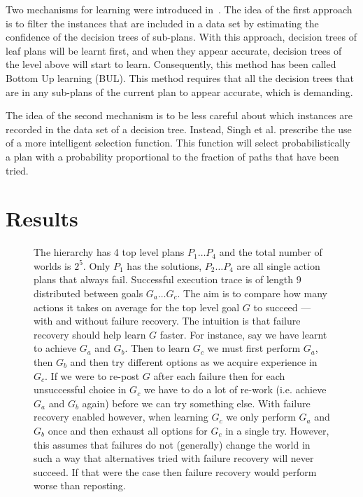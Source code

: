 \documentclass{article}
\begin{document}
Two mechanisms for learning were introduced
in~\cite{Singh10:Learning}. The idea of the first approach is to
filter the instances that are included in a data set by estimating the
confidence of the decision trees of sub-plans. With this approach,
decision trees of leaf plans will be learnt first, and when they
appear accurate, decision trees of the level above will start to
learn. Consequently, this method has been called Bottom Up learning
(BUL). This method requires that all the decision trees that are in
any sub-plans of the current plan to appear accurate, which is
demanding.

The idea of the second mechanism is to be less careful about which
instances are recorded in the data set of a decision tree. Instead,
Singh et al. prescribe the use of a more intelligent selection
function. This function will select probabilistically a plan with a
probability proportional to the fraction of paths that have been
tried.

\section{Results}

\begin{figure*}[t]
\begin{center}
\resizebox{0.8\textwidth}{!}{

}
\end{center}
\caption{The hierarchy has 4 top level plans $P_1 \ldots P_4$ and the total number of worlds is $2^5$. Only $P_1$ has the solutions, $P_2 \ldots P_4$ are all single action plans that always fail. Successful execution trace is of length $9$ distributed between goals $G_a \ldots G_c$. The aim is to compare how many actions it takes on average for the top level goal $G$ to succeed --- with and without failure recovery. The intuition is that failure recovery should help learn $G$ faster. For instance, say we have learnt to achieve $G_a$ and $G_b$. Then to learn $G_c$ we must first perform $G_a$, then $G_b$ and then try different options as we acquire experience in $G_c$. If we were to re-post $G$ after each failure then for each unsuccessful choice in $G_c$ we have to do a lot of re-work (i.e. achieve $G_a$ and $G_b$ again) before we can try something else. With failure recovery enabled however, when learning $G_c$ we only perform $G_a$ and $G_b$ once and then exhaust all options for $G_c$ in a single try. However, this assumes that failures do not (generally) change the world in such a way that alternatives tried with failure recovery will never succeed. If that were the case then failure recovery would perform worse than reposting.}
\label{fig:test01fr}
\end{figure*}
\end{document}
